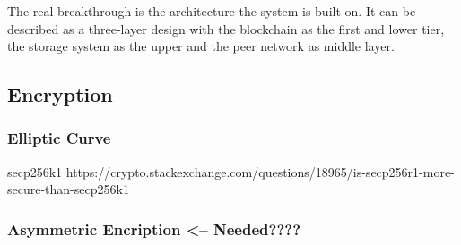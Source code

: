 The real breakthrough is the architecture the system is built on. It can be described as a three-layer design with the blockchain as the first and lower tier, the storage system as the upper and the peer network as middle layer.

\subsection{Encryption}
\subsubsection{Elliptic Curve}
secp256k1
https://crypto.stackexchange.com/questions/18965/is-secp256r1-more-secure-than-secp256k1

\subsubsection{Asymmetric Encription <-- Needed????}



